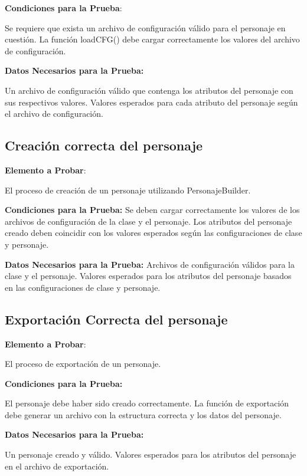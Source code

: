 \documentclass{article}
\begin{document}
\begin{itemize}
\textbf{Condiciones para la Prueba}:

        Se requiere que exista un archivo de configuración válido para el personaje en cuestión.
        La función loadCFG() debe cargar correctamente los valores del archivo de configuración.
        
    \textbf{Datos Necesarios para la Prueba:}
    
        Un archivo de configuración válido que contenga los atributos del personaje con sus respectivos valores.
        Valores esperados para cada atributo del personaje según el archivo de configuración.

\subsection{Creación correcta del personaje}

   \textbf{ Elemento a Probar}: 
   
   El proceso de creación de un personaje utilizando PersonajeBuilder.
   
    \textbf{Condiciones para la Prueba:}
        Se deben cargar correctamente los valores de los archivos de configuración de la clase y el personaje.
        Los atributos del personaje creado deben coincidir con los valores esperados según las configuraciones de clase y personaje.
        
    \textbf{Datos Necesarios para la Prueba:}
        Archivos de configuración válidos para la clase y el personaje.
        Valores esperados para los atributos del personaje basados en las configuraciones de clase y personaje.

\subsection{Exportación Correcta del personaje}


    \textbf{Elemento a Probar}:
    
     El proceso de exportación de un personaje.
    
   \textbf{ Condiciones para la Prueba:}
   
        El personaje debe haber sido creado correctamente.
        La función de exportación debe generar un archivo con la estructura correcta y los datos del personaje.
        
    \textbf{Datos Necesarios para la Prueba:}
    
        Un personaje creado y válido.
        Valores esperados para los atributos del personaje en el archivo de exportación.


\end{itemize}
\end{document}
